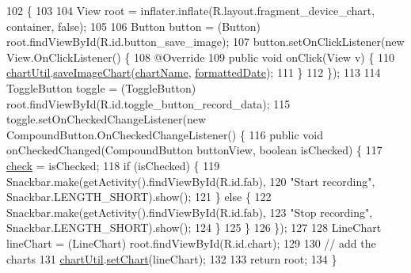 \begin{DoxyCode}
102                                                                                                       \{
103 
104         View root = inflater.inflate(R.layout.fragment\_device\_chart, container, \textcolor{keyword}{false});
105 
106         Button button = (Button) root.findViewById(R.id.button\_save\_image);
107         button.setOnClickListener(\textcolor{keyword}{new} View.OnClickListener() \{
108             @Override
109             \textcolor{keyword}{public} \textcolor{keywordtype}{void} onClick(View v) \{
110                 \hyperlink{classit_1_1unibo_1_1torsello_1_1bluetoothpositioning_1_1fragment_1_1devicesObservers_1_1DeviceChartFragment_afe4ee0e5d07f3efb6887428c9ef04a2e_afe4ee0e5d07f3efb6887428c9ef04a2e}{chartUtil}.\hyperlink{classit_1_1unibo_1_1torsello_1_1bluetoothpositioning_1_1util_1_1ChartUtil_afdbdcf15b073da5b03613dbccc7681a9_afdbdcf15b073da5b03613dbccc7681a9}{saveImageChart}(\hyperlink{classit_1_1unibo_1_1torsello_1_1bluetoothpositioning_1_1fragment_1_1devicesObservers_1_1DeviceChartFragment_a9ca5017dcf37fc7170f8e0605fa2de1b_a9ca5017dcf37fc7170f8e0605fa2de1b}{chartName}, 
      \hyperlink{classit_1_1unibo_1_1torsello_1_1bluetoothpositioning_1_1fragment_1_1devicesObservers_1_1DeviceChartFragment_afffb535ee50475bd5f64ac88d8c12875_afffb535ee50475bd5f64ac88d8c12875}{formattedDate});
111             \}
112         \});
113 
114         ToggleButton toggle = (ToggleButton) root.findViewById(R.id.toggle\_button\_record\_data);
115         toggle.setOnCheckedChangeListener(\textcolor{keyword}{new} CompoundButton.OnCheckedChangeListener() \{
116             \textcolor{keyword}{public} \textcolor{keywordtype}{void} onCheckedChanged(CompoundButton buttonView, \textcolor{keywordtype}{boolean} isChecked) \{
117                 \hyperlink{classit_1_1unibo_1_1torsello_1_1bluetoothpositioning_1_1fragment_1_1devicesObservers_1_1DeviceChartFragment_a4b94bdcbcde2d04fc8d3f6b9950520f0_a4b94bdcbcde2d04fc8d3f6b9950520f0}{check} = isChecked;
118                 \textcolor{keywordflow}{if} (isChecked) \{
119                     Snackbar.make(getActivity().findViewById(R.id.fab),
120                             \textcolor{stringliteral}{"Start recording"}, Snackbar.LENGTH\_SHORT).show();
121                 \} \textcolor{keywordflow}{else} \{
122                     Snackbar.make(getActivity().findViewById(R.id.fab),
123                             \textcolor{stringliteral}{"Stop recording"}, Snackbar.LENGTH\_SHORT).show();
124                 \}
125             \}
126         \});
127 
128         LineChart lineChart = (LineChart) root.findViewById(R.id.chart);
129 
130         \textcolor{comment}{// add the charts}
131         \hyperlink{classit_1_1unibo_1_1torsello_1_1bluetoothpositioning_1_1fragment_1_1devicesObservers_1_1DeviceChartFragment_afe4ee0e5d07f3efb6887428c9ef04a2e_afe4ee0e5d07f3efb6887428c9ef04a2e}{chartUtil}.\hyperlink{classit_1_1unibo_1_1torsello_1_1bluetoothpositioning_1_1util_1_1ChartUtil_a26e84414723ff1ca38d8f2907ed3322e_a26e84414723ff1ca38d8f2907ed3322e}{setChart}(lineChart);
132 
133         \textcolor{keywordflow}{return} root;
134     \}
\end{DoxyCode}
